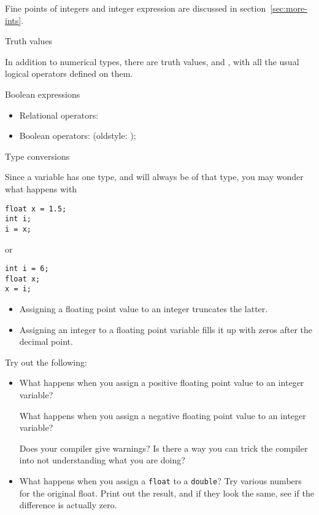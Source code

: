 Fine points of integers and integer expression
are discussed in section~\ref{sec:more-ints}.

 {Truth values}

In addition to numerical types, there are truth values,
 and , with all the usual logical
operators defined on them.

\begin{block}{Boolean expressions}
  \label{sl:bool-expr}
  \begin{itemize}
  \item Relational operators: \n{== != < > <= >=}
  \item Boolean operators:  (oldstyle:  \n{! && ||});
  \end{itemize}
\end{block}

 {Type conversions}

Since a variable has one type, and will always be of that type,
you may wonder what happens with
\begin{lstlisting}
float x = 1.5;
int i;
i = x;
\end{lstlisting}
or 
\begin{lstlisting}
int i = 6;
float x;
x = i;
\end{lstlisting}

\begin{itemize}
\item Assigning a floating point value to an integer truncates the
  latter.
\item Assigning an integer to a floating point variable fills it up
  with zeros after the decimal point.
\end{itemize}

\begin{exercise}
  \label{ex:float-convert}
  Try out the following:
  \begin{itemize}
  \item What happens when you assign a positive floating
    point value to an integer variable?

   What happens when you assign a negative floating
    point value to an integer variable?

    Does your compiler give warnings?
    Is there a way you can trick the compiler into not understanding what you are doing?
  \item What happens when you assign a \lstinline{float} to a \lstinline{double}?
    Try various numbers for the original float. 
    Print out the result, and if they look the same, see if the difference is actually zero.
  \end{itemize}
\end{exercise}

